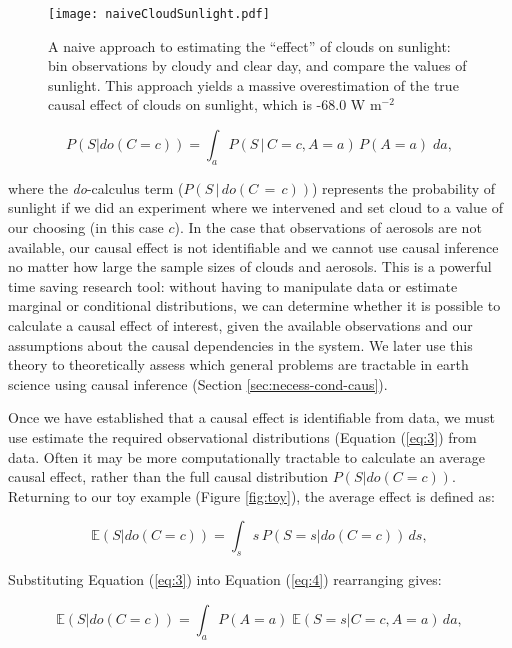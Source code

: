 \documentclass[12pt]{article}
\begin{document}
\begin{figure}
  \texttt{[image: naiveCloudSunlight.pdf]}
  \caption{A naive approach to estimating the ``effect'' of clouds on
    sunlight: bin observations by cloudy and clear day, and compare
    the values of sunlight. This approach yields a massive
    overestimation of the true causal effect of clouds on sunlight,
    which is -68.0 W m$^{-2}$}
  \label{fig:naive-cloud-sunlight}
\end{figure}

\begin{equation}
  P(S | do(C = c)) = \int_{a} P(S \, | \, C = c,
  A=a) \, P(A=a) \; da,
  \label{eq:3}
\end{equation}

where the \textit{do}-calculus \citep{pearl2009} term
($P(S \, | \, do(C\, = \,c))$) represents the probability of sunlight
if we did an experiment where we intervened and set cloud to a value
of our choosing (in this case $c$). In the case that observations of
aerosols are not available, our causal effect is not identifiable and
we cannot use causal inference no matter how large the sample sizes of
clouds and aerosols. This is a powerful time saving research tool:
without having to manipulate data or estimate marginal or conditional
distributions, we can determine whether it is possible to calculate a
causal effect of interest, given the available observations and our
assumptions about the causal dependencies in the system.  We later use
this theory to theoretically assess which general problems are
tractable in earth science using causal inference (Section
\ref{sec:necess-cond-caus}).

Once we have established that a causal effect is identifiable from
data, we must use estimate the required observational distributions
(Equation (\ref{eq:3}) from data. Often it may be more computationally
tractable to calculate an average causal effect, rather than the full
causal distribution $P(S | do(C=c))$. Returning to our toy example
(Figure \ref{fig:toy}), the average effect is defined as:

\begin{equation}
  \mathbb{E}(S | do(C = c)) = \int_{s} s \, P(S = s
  | do(C=c)) \, ds,
  \label{eq:4}
\end{equation}

Substituting Equation (\ref{eq:3}) into Equation (\ref{eq:4})
rearranging gives:

\begin{equation}
  \mathbb{E}(S | do(C = c))  = \int_{a} P(A=a) \; \mathbb{E}(S=s |
  C=c, A=a) \, d a,
  \label{eq:5}
\end{equation}
\end{document}
